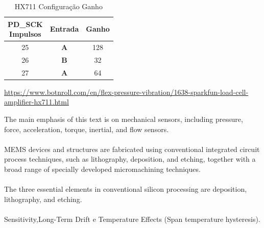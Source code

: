 \begin{table}[H]
	\captionsetup{justification=raggedright,singlelinecheck=false}
	\begin{tabular}{ | c | c | c |  }
		\hline
		\makecell[c]{PD\_SCK \\ Impulsos} & Entrada  & Ganho \\
		\hline
		\hline
		25 & \textbf{A} & 128 \\
		\hline
		26 & \textbf{B} & 32 \\
		\hline
		27 & \textbf{A} & 64 \\
		\hline
	\end{tabular}	
	\caption{HX711 Configuração Ganho}
	\label{Gain_Selection}
\end{table}


\url{https://www.botnroll.com/en/flex-pressure-vibration/1638-sparkfun-load-cell-amplifier-hx711.html}

The main emphasis of this text is on mechanical sensors,
including pressure, force, acceleration, torque, inertial, and flow sensors. \cite{book-9}
\\
\\

MEMS devices and structures are fabricated using conventional integrated circuit
process techniques, such as lithography, deposition, and etching, together with a
broad range of specially developed micromachining techniques. \cite{book-9}
\\
\\
The three essential elements in conventional
silicon processing are deposition, lithography, and etching. \cite{book-9}
\\
\\
Sensitivity,Long-Term Drift e Temperature Effects (Span temperature hysteresis).


